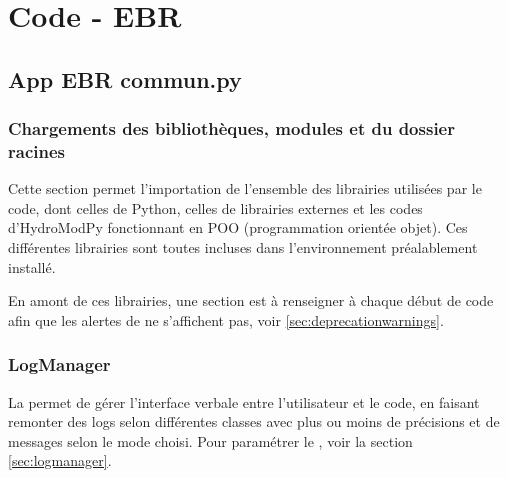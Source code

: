 
\chapter{Code - EBR}
\label{chap:code_ebr}

\minitableofcontents

\newpage


\section{App EBR commun.py}
\label{sec:app_ebr_commun}

\subsection{Chargements des bibliothèques, modules et du dossier racines}
\label{sec:chargements_bibliotheques_modules_dossier_racines}

Cette section permet l'importation de l'ensemble des librairies utilisées par le code, dont celles de Python, celles de librairies externes et les codes d'HydroModPy fonctionnant en POO (programmation orientée objet). Ces différentes librairies sont toutes incluses dans l'environnement  préalablement installé.


En amont de ces librairies, une section  est à renseigner à chaque début de code afin que les alertes de  ne s'affichent pas, voir \ref{sec:deprecationwarnings}.

\subsection{LogManager}
\label{sec:logmanager-ebr}

La  permet de gérer l'interface verbale entre l'utilisateur et le code, en faisant remonter des logs selon différentes classes avec plus ou moins de précisions et de messages selon le mode choisi. Pour paramétrer le , voir la section \ref{sec:logmanager}.

